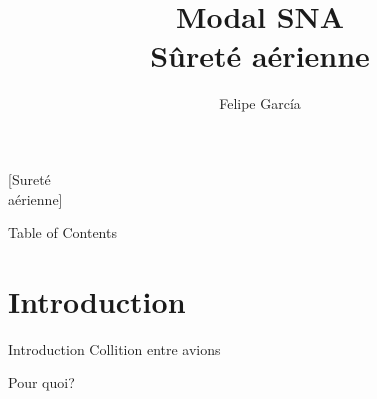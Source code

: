 \documentclass{beamer} %
\begin{document}
	
	\title[
	\begin{tabular}{r l}
	Coordinateur : & Emmanuel Gobet\\
	Auteur : & Felipe García\\
	\end{tabular}
	]{Modal SNA  \\ Sûreté aérienne}[Sureté\\ aérienne]
	\author[]{Felipe García}
		
	\maketitle
	
	\begin{frame}[t]{Table of Contents}
		\tableofcontents
	\end{frame}
	
	\section{Introduction} %
	\label{sec:introduction}
	\begin{frame}[t]{Introduction}
		Collition entre avions
	\end{frame}
	\begin{frame}[t]{Pour quoi?}
		
	\end{frame}
\end{document}
